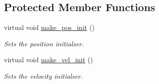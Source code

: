 \subsection*{Protected Member Functions}
\begin{DoxyCompactItemize}
\item 
virtual void \hyperlink{classphysim_1_1init_1_1hose_aa016b0a21281702a41368c8bd0fb5745}{make\+\_\+pos\+\_\+init} ()
\begin{DoxyCompactList}\small\item\em Sets the position initialser. \end{DoxyCompactList}\item 
virtual void \hyperlink{classphysim_1_1init_1_1hose_a7b5f4309df8149bfb3d81e538e71ef24}{make\+\_\+vel\+\_\+init} ()
\begin{DoxyCompactList}\small\item\em Sets the velocity initialser. \end{DoxyCompactList}\end{DoxyCompactItemize}
